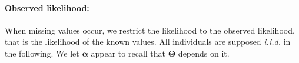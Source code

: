 \documentclass[12pt,a4paper]{report}
\begin{document}
\paragraph{Observed likelihood:} 
%
	 When missing values occur, we restrict the likelihood to the observed likelihood, that is the likelihood of the known values. All individuals are supposed {\it i.i.d.} in the following. We let $\boldsymbol{\alpha}$ appear to recall that $\boldsymbol{\Theta}$ depends on it. 
				 		
\end{document}
